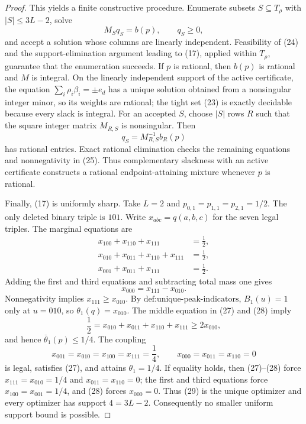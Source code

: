 \documentclass{article}
\begin{document}
\begin{proof}
This yields a finite constructive procedure.  Enumerate subsets \(S\subseteq T_\rho\) with \(|S|\leq3L-2\), solve
\[
 M_Sq_S=b(p),\qquad q_S\geq0,                                               \tag{25}
\]
and accept a solution whose columns are linearly independent.  Feasibility of (24) and the support-elimination argument leading to (17), applied within \(T_\rho\), guarantee that the enumeration succeeds.  If \(p\) is rational, then \(b(p)\) is rational and \(M\) is integral.  On the linearly independent support of the active certificate, the equation \(\sum_i\rho_i\beta_i=\pm e_d\) has a unique solution obtained from a nonsingular integer minor, so its weights are rational; the tight set (23) is exactly decidable because every slack is integral.  For an accepted \(S\), choose \(|S|\) rows \(R\) such that the square integer matrix \(M_{R,S}\) is nonsingular.  Then
\[
 q_S=M_{R,S}^{-1}b_R(p)                                                     \tag{26}
\]
has rational entries.  Exact rational elimination checks the remaining equations and nonnegativity in (25).  Thus complementary slackness with an active certificate constructs a rational endpoint-attaining mixture whenever \(p\) is rational.

Finally, (17) is uniformly sharp.  Take \(L=2\) and \(p_{0,1}=p_{1,1}=p_{2,1}=1/2\).  The only deleted binary triple is \(101\).  Write \(x_{abc}=q(a,b,c)\) for the seven legal triples.  The marginal equations are
\[
\begin{aligned}
 x_{100}+x_{110}+x_{111}&=\frac12,\\
 x_{010}+x_{011}+x_{110}+x_{111}&=\frac12,\\
 x_{001}+x_{011}+x_{111}&=\frac12.
\end{aligned}                                                               \tag{27}
\]
Adding the first and third equations and subtracting total mass one gives
\[
 x_{000}=x_{111}-x_{010}.                                                    \tag{28}
\]
Nonnegativity implies \(x_{111}\geq x_{010}\).  By \(\text{def:unique-peak-indicators}\), \(B_1(u)=1\) only at \(u=010\), so \(\theta_1(q)=x_{010}\).  The middle equation in (27) and (28) imply
\[
 \frac12=x_{010}+x_{011}+x_{110}+x_{111}\geq2x_{010},
\]
and hence \(\overline\theta_1(p)\leq1/4\).  The coupling
\[
 x_{001}=x_{010}=x_{100}=x_{111}=\frac14,
 \qquad x_{000}=x_{011}=x_{110}=0                                          \tag{29}
\]
is legal, satisfies (27), and attains \(\theta_1=1/4\).  If equality holds, then (27)--(28) force \(x_{111}=x_{010}=1/4\) and \(x_{011}=x_{110}=0\); the first and third equations force \(x_{100}=x_{001}=1/4\), and (28) forces \(x_{000}=0\).  Thus (29) is the unique optimizer and every optimizer has support \(4=3L-2\).  Consequently no smaller uniform support bound is possible.
\end{proof}
\end{document}
